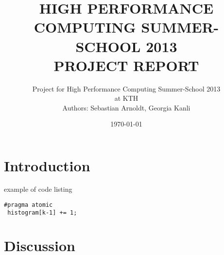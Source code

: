 \documentclass[a4paper,12pt]{article}
\title{\textbf{HIGH PERFORMANCE COMPUTING SUMMER-SCHOOL 2013 \\ PROJECT REPORT}}
\author{Project for High Performance Computing Summer-School 2013 \\ at KTH\\ Authors: Sebastian Arnoldt, Georgia Kanli}
\date{\today}
\begin{document}
\maketitle
\thispagestyle{empty}
\newpage
\setcounter{page}{1}
\tableofcontents
\newpage

\section{Introduction}


example of code listing

\begin{lstlisting}
#pragma atomic
 histogram[k-1] += 1;
\end{lstlisting}


 
\section{Discussion}
\end{document}
